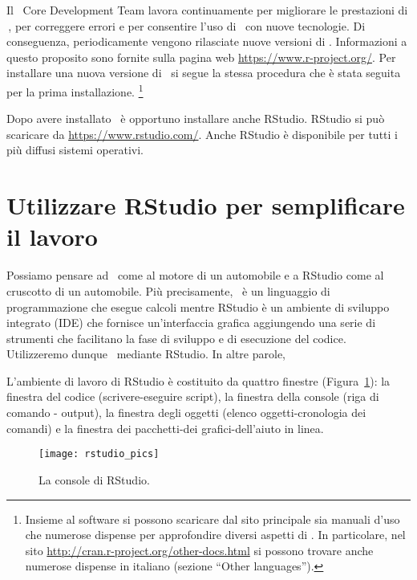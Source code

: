 Il \R\, Core Development Team lavora continuamente per migliorare le prestazioni di \R\,, per correggere errori e per consentire l'uso di \R\, con nuove tecnologie.  
Di conseguenza, periodicamente vengono rilasciate nuove versioni di \R. 
Informazioni a questo proposito sono fornite sulla pagina web \url{https://www.r-project.org/}. 
Per installare una nuova versione di \R\, si segue la stessa procedura che è stata seguita per la prima installazione.
\footnote{
Insieme al software si possono scaricare dal sito principale sia manuali d'uso che numerose dispense per approfondire diversi aspetti di \R. 
In particolare, nel sito \url{http://cran.r-project.org/other-docs.html} si possono trovare anche numerose dispense in italiano (sezione ``Other languages'').
}

Dopo avere installato \R\, è opportuno installare anche RStudio.
RStudio si può scaricare da \url{https://www.rstudio.com/}.
Anche RStudio è disponibile per tutti i più diffusi sistemi operativi.


\section{Utilizzare RStudio per semplificare il lavoro}

Possiamo pensare ad \R\, come al motore di un automobile e a RStudio come al cruscotto di un automobile.
Più precisamente, \R\, è un linguaggio di programmazione che esegue calcoli mentre RStudio è un ambiente di sviluppo integrato (IDE) che fornisce un'interfaccia grafica aggiungendo una serie di strumenti che facilitano la fase di sviluppo e di esecuzione del codice.
Utilizzeremo dunque \R\, mediante RStudio.
In altre parole, 
\begin{figure}[h!]%
\captionsetup[subfigure]{labelformat=empty}
    \centering
    \qquad\qquad\qquad\qquad
\end{figure}

L'ambiente di lavoro di RStudio è costituito da quattro finestre (Figura~\ref{fig:rstudio_pics}):
 la finestra del codice (scrivere-eseguire script),
 la finestra della console (riga di comando - output),
la finestra degli oggetti (elenco oggetti-cronologia dei comandi) e
la finestra dei pacchetti-dei grafici-dell'aiuto in linea.

\begin{figure}[h!]
\centering
\texttt{[image: rstudio\_pics]}
\caption{La console di RStudio.}
\label{fig:rstudio_pics}
\end{figure}


